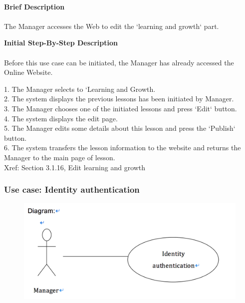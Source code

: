 \documentclass[12pt]{report}
\begin{document}
\paragraph{}
\begin{flushleft}
\textbf{Brief Description }
\paragraph{}
The Manager accesses the Web to edit the `learning and growth` part.\\

\begin{flushleft}
\textbf{Initial Step-By-Step Description }
\paragraph{}
Before this use case can be initiated, the Manager has already accessed the Online Website.

\begin{flushleft}
1.	The Manager selects to `Learning and Growth. \\
2.	The system displays the previous lessons has been initiated by Manager. \\
3.	The Manager chooses one of the initiated lessons and press `Edit` button. \\
4.	The system displays the edit page. \\
5.	The Manager edits some details about this lesson and press the `Publish` button. \\
6.	The system transfers the lesson information to the website and returns the Manager to the main page of lesson. \\
Xref: Section 3.1.16, Edit learning and growth
\end{flushleft}
\end{flushleft}
\end{flushleft}


\newpage
\subsubsection{Use case: Identity authentication}

\begin{figure}[!htb]
  \includegraphics{23.PNG}
\end{figure}
\end{document}
